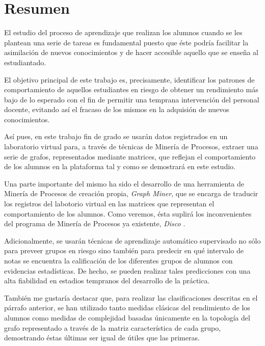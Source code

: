 \chapter*{Resumen}


El estudio del proceso de aprendizaje que realizan los alumnos cuando se les plantean una serie de tareas es fundamental puesto que éste podría facilitar la asimilación de nuevos conocimientos y de hacer accesible aquello que se enseña al estudiantado.

El objetivo principal de este trabajo es, precisamente, identificar los patrones de comportamiento de aquellos estudiantes en riesgo de obtener un rendimiento más bajo de lo esperado con el fin de permitir una temprana intervención del personal docente, evitando así el fracaso de los mismos en la adquisión de nuevos conocimientos.

Así pues, en este trabajo fin de grado se usarán datos registrados en un laboratorio virtual para, a través de técnicas de Minería de Procesos, extraer una serie de grafos, representados mediante matrices, que reflejan el comportamiento de los alumnos en la plataforma tal y como se demostrará en este estudio.

Una parte importante del mismo ha sido el desarrollo de una herramienta de Minería de Procesos de creación propia, \emph{Graph Miner}, que se encarga de traducir los registros del labotorio virtual en las matrices que representan el comportamiento de los alumnos. Como veremos, ésta suplirá los inconvenientes del programa de Minería de Procesos ya existente, \emph{Disco} \cite{gunther2012disco}.

Adicionalmente, se usarán técnicas de aprendizaje automático supervisado no sólo para preveer grupos en riesgo sino también para predecir en qué intervalo de notas se encuentra la calificación de los diferentes grupos de alumnos con evidencias estadísticas. De hecho, se pueden realizar tales predicciones con una alta fiabilidad en estadios tempranos del desarrollo de la práctica.

También me gustaría destacar que, para realizar las clasificaciones descritas en el párrafo anterior, se han utilizado tanto medidas clásicas del rendimiento de los alumnos como medidas de complejidad basadas únicamente en la topología del grafo representado a través de la matriz característica de cada grupo, demostrando éstas últimas ser igual de útiles que las primeras.

